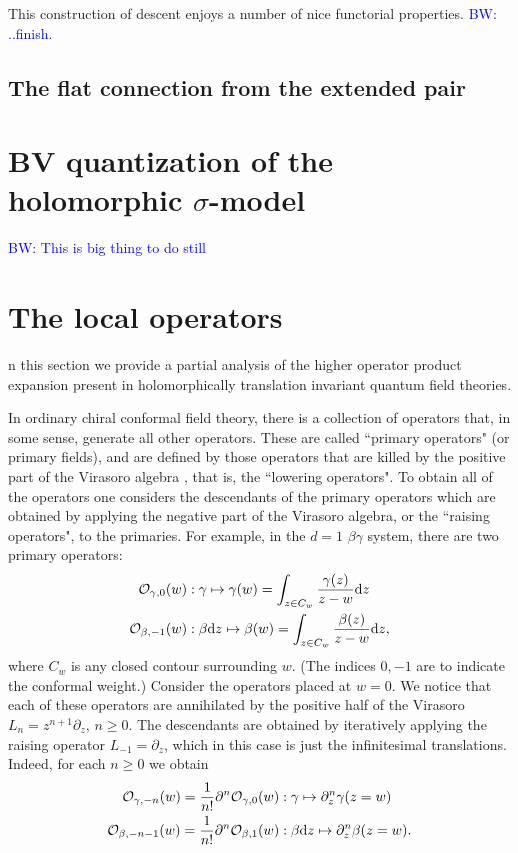\documentclass[10pt]{amsart}
\def\brian{\textcolor{blue}{BW: }\textcolor{blue}}
\begin{document}
\begin{rmk} 
This construction of descent enjoys a number of nice functorial properties. \brian{..finish}.
\end{rmk}

\subsection{The flat connection from the extended pair}

\section{BV quantization of the holomorphic $\sigma$-model}

\brian{This is big thing to do still}

\section{The local operators}
n this section we provide a partial analysis of the higher operator product expansion present in holomorphically translation invariant quantum field theories. 

In ordinary chiral conformal field theory, there is a collection of operators that, in some sense, generate all other operators. 
These are called ``primary operators" (or primary fields), and are defined by those operators that are killed by the positive part of the Virasoro algebra \cite{polchinski}, that is, the ``lowering operators". 
To obtain all of the operators one considers the descendants of the primary operators which are obtained by applying the negative part of the Virasoro algebra, or the ``raising operators", to the primaries. 
For example, in the $d=1$ $\beta\gamma$ system, there are two primary operators:
\begin{align*}
\mathcal O_{\gamma,0} (w) & : \gamma \mapsto \gamma(w) = \int_{z \in C_w} \frac{\gamma(z)}{z-w} {\rm d} z  \\
\mathcal O_{\beta,-1} (w) & : \beta {\rm d} z \mapsto \beta(w) = \int_{z \in C_w} \frac{\beta(z)}{z-w} {\rm d} z ,
\end{align*}
where $C_w$ is any closed contour surrounding $w$. 
(The indices $0,-1$ are to indicate the conformal weight.)
Consider the operators placed at $w=0$.
We notice that each of these operators are annihilated by the positive half of the Virasoro $L_n = z^{n+1} \partial_z$, $n \geq 0$.
The descendants are obtained by iteratively applying the raising operator $L_{-1} = \partial_z$, which in this case is just the infinitesimal translations. 
Indeed, for each $n \geq 0$ we obtain
\begin{align*}
\mathcal O_{\gamma,-n}(w) = \frac{1}{n!} \partial^n \mathcal O_{\gamma,0}(w) & : \gamma \mapsto \partial_z^n \gamma(z = w) \\
\mathcal O_{\beta,-n-1}(w) = \frac{1}{n!} \partial^n \mathcal O_{\beta,1}(w) & : \beta {\rm d} z \mapsto \partial_z^n \beta(z=w) .
\end{align*}
\end{document}
